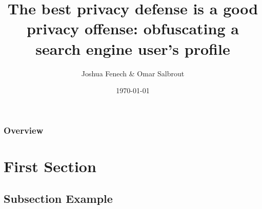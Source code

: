 \documentclass{beamer}
\title[The best privacy defense is a good privacy offense]{The best privacy defense is a good privacy offense: obfuscating a search engine user’s profile} %
\author{Joshua Fenech \& Omar Salbrout} %
\institute[MLDM] %
{University of Jean Monnet \\ %
\medskip
\textit{jfenech22@hotmail.com} %
}
\date{\today} %
\begin{document}
\begin{frame}
\titlepage %
\end{frame}

\begin{frame}
\frametitle{Overview} %
\tableofcontents %
\end{frame}


\section{First Section} %

\subsection{Subsection Example} %


\end{document}
